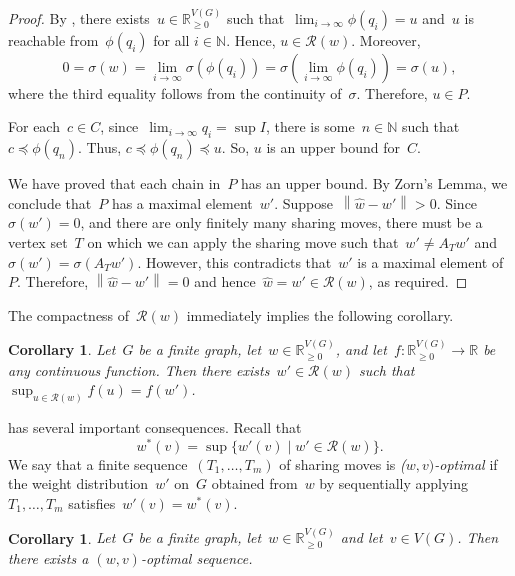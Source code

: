 \documentclass[reqno, 12pt]{amsart}
\numberwithin{equation}{section}
\numberwithin{figure}{section}
\theoremstyle{plain}
\newtheorem{corollary}[thm]{Corollary}
\theoremstyle{definition}
\renewcommand{\preceq}{\preccurlyeq}
\newcommand*{\weights}{\ensuremath{\mathbb{R}_{\geq 0}^{V(G)}}}
\newcommand{\norm}[1]{\ensuremath{\left\lVert {#1} \right\rVert}}
\begin{document}
\begin{proof}
    By , there exists~${u \in \weights}$ such that~${\lim_{i \to \infty} \phi(q_i) = u}$ and~$u$ is reachable from~$\phi(q_i)$ for all $i \in \mathbb{N}$.  
    Hence, ${u \in \mathcal{R}(w)}$. 
    Moreover,
    \[
       0= \sigma(w) 
        = \lim_{i \to \infty} \sigma(\phi(q_i)) 
        = \sigma(\lim_{i \to \infty} \phi(q_i)) 
        = \sigma(u), 
    \]
    where the third equality follows from the continuity of~$\sigma$. 
    Therefore, ${u \in P}$.  
    
    For each~${c \in C}$, since~${\lim_{i \to \infty} q_i = \sup I}$, there is some~${n \in \mathbb{N}}$ such that~${c \preceq \phi(q_n)}$. 
    Thus, ${c \preceq \phi(q_n) \preceq u}$. 
    So, $u$ is an upper bound for~$C$. 
    
    We have proved that each chain in~$P$ has an upper bound. 
    By Zorn's Lemma, we conclude that~$P$ has a maximal element~$w'$. 
    Suppose~${\norm{\hat{w} - w'} > 0}$. 
    Since~${\sigma(w') = 0}$, and there are only finitely many sharing moves, there must be a vertex set~$T$ on which we can apply the sharing move such that~${w' \neq A_Tw'}$ and~${\sigma(w') = \sigma(A_Tw')}$. 
    However, this contradicts that~$w'$ is a maximal element of~$P$. 
    Therefore, ${\norm{\hat{w} - w'} = 0}$ and hence~${\hat{w} = w' \in \mathcal{R}(w)}$, as required.
\end{proof}

The compactness of~$\mathcal{R}(w)$ immediately implies the following corollary. 

\begin{corollary}
    \label{cor:supremum}
    Let~$G$ be a finite graph, let~${w \in \weights}$, and let~${f \colon \weights \to \mathbb{R}}$ be any continuous function. 
    Then there exists~${w' \in \mathcal{R}(w)}$ such that ${\sup_{u \in \mathcal{R}(w)} f(u) = f(w')}$. 
\end{corollary}

 has several important consequences.  Recall that 
\[
    w^*(v) = \sup \{w'(v) \mid \text{$w' \in \mathcal{R}(w)$} \}.
\]
We say that a finite sequence~${(T_1, \dots, T_m)}$ of sharing moves is \emph{($w, v)$-optimal} if the weight distribution~$w'$ on~$G$ obtained from~$w$ by sequentially applying~${T_1, \dots, T_m}$ satisfies~${w'(v) = w^*(v)}$. 

\begin{corollary}
    \label{cor:wvoptimal}
    Let~$G$ be a finite graph, let~${w \in \weights}$ and let~${v \in V(G)}$. 
    Then there exists a $(w,v)$-optimal sequence.
\end{corollary}
\end{document}
